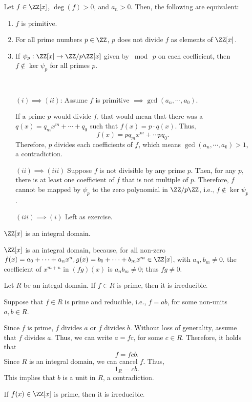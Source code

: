 \begin{lem}\label{l24:lem6}
	Let $f \in \ZZ[x]$,  $\deg(f) > 0$, and  $a_n > 0$. Then, the following are equivalent:
	 \begin{enumerate}
		\item $f$ is primitive.
		\item For all prime numbers $p \in \ZZ$, $p$ does not divide $f$ as elements of $\ZZ[x]$. 
		\item If $\psi_p : \ZZ[x] \to \ZZ/p\ZZ[x]$ given by $\bmod{\ p}$ on each coefficient, then $f \not\in \ker\psi_p$ for all primes $p$.
	\end{enumerate}
\end{lem}

\begin{dem}~
	\begin{itemize}
		\item[$(i) \implies (ii)$:] Assume $f$ is primitive $\implies \gcd(a_n, \cdots, a_0)$.
			
			If a prime $p$ would divide $f$, that would mean that there was a $q(x) = q_mx^m + \cdots + q_0$ such that $f(x) = p \cdot q(x)$. Thus, \[f(x) = pq_mx^m + \cdots pq_0.\]
			Therefore, $p$ divides each coefficients of $f$, which means $\gcd(a_n, \cdots, a_0) > 1$, a contradiction.

		\item[$(ii) \implies (iii)$] Suppose $f$ is not divisible by any prime $p$. Then, for any $p$, there is at least one coefficient of $f$ that is not multiple of $p$. Therefore, $f$ cannot be mapped by $\psi_p$ to the zero polynomial in $\ZZ/p\ZZ$, i.e.,  $f \not\in \ker\psi_p$.

		\item[$(iii) \implies (i)$] Left as exercise.
	\end{itemize}
\end{dem}

\begin{prop}
	$\ZZ[x]$ is an integral domain.
\end{prop}

\begin{dem}
	$\ZZ[x]$ is an integral domain, because, for all non-zero $f(x) = a_0 + \cdots + a_nx^n, g(x) = b_0 + \cdots + b_mx^m \in \ZZ[x]$, with $a_n, b_m \neq 0$, the coefficient of $x^{m+n}$ in $(fg)(x)$ is $a_nb_m \neq 0$; thus $fg \neq 0$.
\end{dem}


\begin{prop}
	Let $R$ be an integal domain. If $f \in R$ is prime, then it is irreducible.
\end{prop}
\begin{dem}
	Suppose that $f \in R$ is prime and reducible, i.e., $f = ab$, for some non-units $a, b \in R$. 

	Since $f$ is prime, $f$ divides $a$ or $f$ divides $b$. Without loss of generality, assume that $f$ divides $a$. Thus, we can write $a = f c$, for some $c\in R$. Therefore, it holds that \[f = f c b.\] 
	Since $R$ is an integral domain, we can cancel $f$. Thus, \[1_R = c b.\]
	This implies that $b$ is a unit in $R$, a contradiction.
\end{dem}

\begin{cor} \label{l24:cor9}
	If $f(x) \in \ZZ[x]$ is prime, then it is irreducible.
\end{cor}
